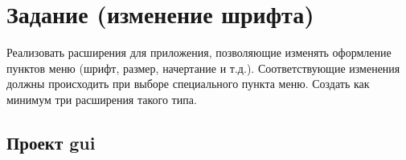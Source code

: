 
\section{Задание (изменение шрифта)}

Реализовать расширения для приложения, позволяющие изменять оформление пунктов меню
(шрифт, размер, начертание и т.д.).
Соответствующие изменения должны происходить при выборе специального пункта меню.
Создать как минимум три расширения такого типа.

\subsection{Проект gui}


